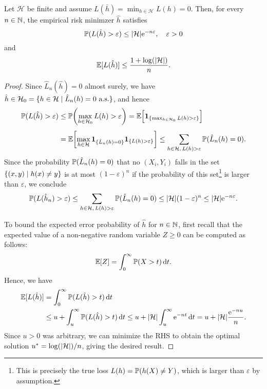 \begin{theorem}
Let $\mathcal{H}$ be finite and assume $L(\bar{h}) = \min_{h \in \mathcal{H}} L(h) = 0$. Then, for every $n \in \mathbb{N}$, the empirical risk minimzer $\hat{h}$ satisfies
\[
    \operatorname{\mathbb{P}}(L(\hat{h}) > \varepsilon) \leq \abs{\mathcal{H}} \mathrm{e}^{-n \varepsilon}, \quad \varepsilon > 0
\]
and
\[
    \operatorname{\mathbb{E}}[L(\hat{h})] \leq \frac{1 + \log(\abs{\mathcal{H}})}{n}.
\]
\end{theorem}

\begin{proof}
Since $\hat{L}_n(\hat{h}) = 0$ almost surely, we have $\hat{h} \in \mathcal{H}_0 = \{h \in \mathcal{H} \mathrel{|} \hat L_n(h) = 0 \text{ a.s.}\}$, and hence
\begin{align*}
    \Prob(L(\hat{h}) > \varepsilon) &\leq \Prob\left(\max_{h \in \mathcal{H}_0} L(h) > \varepsilon\right) = \Exp\left[\ind{\{\max_{h \in \mathcal{H}_0} L(h) > \varepsilon\}}\right] \\[4pt]
    &=\Exp\left[\max_{h \in \mathcal{H}} \ind{\{\hat{L}_n(h) = 0\}} \indSet{L(h) > \varepsilon}\right] \leq \sum_{h \in \mathcal{H}, \, L(h) > \varepsilon} \Prob(\hat{L}_n(h) = 0).
\end{align*}
Since the probability $\operatorname{\mathbb{P}}(\hat{L}_n(h) = 0)$ that no $(X_i, Y_i)$ falls in the set $\set{(x, y) \with h(x) \neq y}$ is at most $(1 - \varepsilon)^n$ if the probability of this set\footnote{This is precisely the true loss $L(h) = \operatorname{\mathbb{P}}(h(X) \neq Y)$, which is larger than $\varepsilon$ by assumption.} is larger than $\varepsilon$, we conclude
\[
    \operatorname{\mathbb{P}}(L(\hat{h}_n) > \varepsilon) \leq \sum_{h \in \mathcal{H}, \, L(h) > \varepsilon} \operatorname{\mathbb{P}}(\hat{L}_n(h) = 0) \leq \abs{\mathcal{H}} (1 - \varepsilon)^n \leq \abs{\mathcal{H}} \mathrm{e}^{-n \varepsilon}.
\]

To bound the expected error probability of $\hat{h}$ for $n \in \mathbb{N}$, first recall that the expected value of a non-negative random variable $Z \geq 0$ can be computed as follows:
\[
    \operatorname{\mathbb{E}}[Z] = \int_0^{\infty} \operatorname{\mathbb{P}}(X > t) \, \mathrm{d}t.
\]
Hence, we have
\begin{align*}
    \operatorname{\mathbb{E}}[L(\hat{h})] &= \int_0^{\infty} \operatorname{\mathbb{P}}(L(\hat{h}) > t) \, \mathrm{d}t \\
    &\leq u + \int_u^{\infty} \operatorname{\mathbb{P}}(L(\hat{h}) > t) \, \mathrm{d}t \leq u + \abs{\mathcal{H}} \int_u^{\infty} \mathrm{e}^{-nt} \, \mathrm{d}t = u + \abs{\mathcal{H}} \frac{\mathrm{e}^{-nu}}{n}.
\end{align*}
Since $u > 0$ was arbitrary, we can minimize the RHS to obtain the optimal solution $u^* = \log(\abs{\mathcal{H}}) / n$, giving the desired result.
\end{proof}
